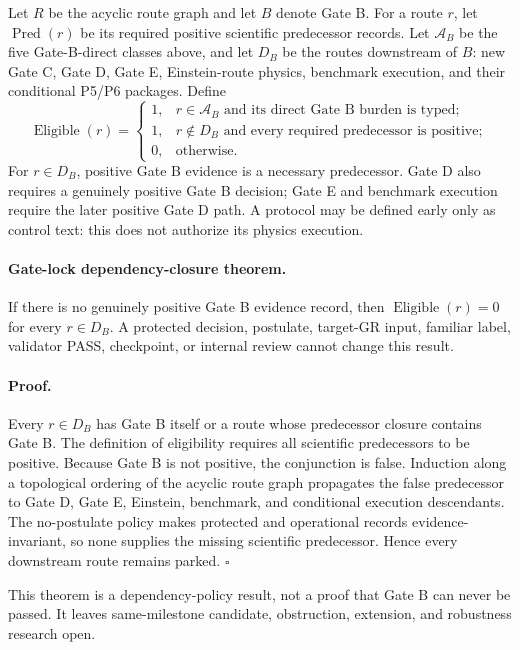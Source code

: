 \documentclass[11pt]{article}
\newcommand{\Eligible}{\operatorname{Eligible}}
\begin{document}
Let $R$ be the acyclic route graph and let $B$ denote Gate B. For a route $r$,
let $\operatorname{Pred}(r)$ be its required positive scientific predecessor
records. Let $\mathcal A_B$ be the five Gate-B-direct classes above, and let
$D_B$ be the routes downstream of $B$: new Gate C, Gate D, Gate E,
Einstein-route physics, benchmark execution, and their conditional P5/P6
packages. Define
\[
 \Eligible(r)=
 \begin{cases}
  1,&r\in\mathcal A_B\text{ and its direct Gate B burden is typed};\\
  1,&r\notin D_B\text{ and every required predecessor is positive};\\
  0,&\text{otherwise}.
 \end{cases}
\]
For $r\in D_B$, positive Gate B evidence is a necessary predecessor. Gate D
also requires a genuinely positive Gate B decision; Gate E and benchmark
execution require the later positive Gate D path. A protocol may be defined
early only as control text: this does not authorize its physics execution.

\paragraph{Gate-lock dependency-closure theorem.}
If there is no genuinely positive Gate B evidence record, then
$\Eligible(r)=0$ for every $r\in D_B$. A protected decision, postulate,
target-GR input, familiar label, validator PASS, checkpoint, or internal review
cannot change this result.

\paragraph{Proof.}
Every $r\in D_B$ has Gate B itself or a route whose predecessor closure
contains Gate B. The definition of eligibility requires all scientific
predecessors to be positive. Because Gate B is not positive, the conjunction
is false. Induction along a topological ordering of the acyclic route graph
propagates the false predecessor to Gate D, Gate E, Einstein, benchmark, and
conditional execution descendants. The no-postulate policy makes protected
and operational records evidence-invariant, so none supplies the missing
scientific predecessor. Hence every downstream route remains parked.
$\square$

This theorem is a dependency-policy result, not a proof that Gate B can never
be passed. It leaves same-milestone candidate, obstruction, extension, and
robustness research open.
\end{document}
